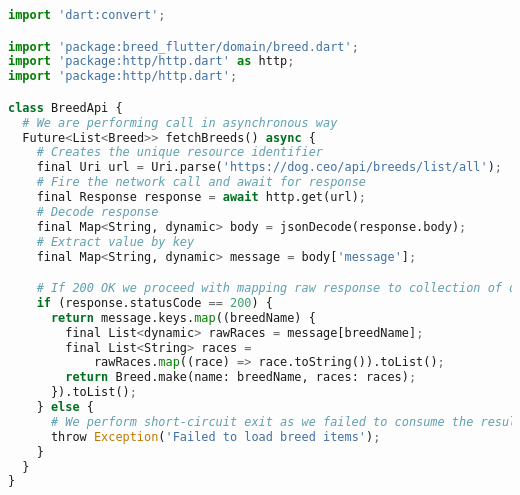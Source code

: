 \begin{lstlisting}[style=light, language=Python,label={lst:flutter_networking},caption=Flutter Networking]
import 'dart:convert';

import 'package:breed_flutter/domain/breed.dart';
import 'package:http/http.dart' as http;
import 'package:http/http.dart';

class BreedApi {
  # We are performing call in asynchronous way
  Future<List<Breed>> fetchBreeds() async {
    # Creates the unique resource identifier
    final Uri url = Uri.parse('https://dog.ceo/api/breeds/list/all');
    # Fire the network call and await for response
    final Response response = await http.get(url);
    # Decode response
    final Map<String, dynamic> body = jsonDecode(response.body);
    # Extract value by key
    final Map<String, dynamic> message = body['message'];

    # If 200 OK we proceed with mapping raw response to collection of domain types
    if (response.statusCode == 200) {
      return message.keys.map((breedName) {
        final List<dynamic> rawRaces = message[breedName];
        final List<String> races =
            rawRaces.map((race) => race.toString()).toList();
        return Breed.make(name: breedName, races: races);
      }).toList();
    } else {
      # We perform short-circuit exit as we failed to consume the result
      throw Exception('Failed to load breed items');
    }
  }
}
\end{lstlisting}
